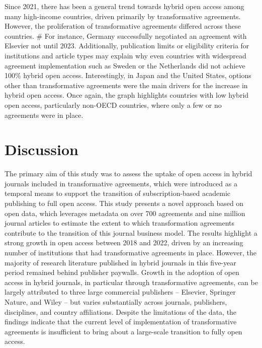 \documentclass[a4paper,man,floatsintext,longtable,noextraspace,12pt]{apa6}
\begin{document}
Since 2021, there has been a general trend towards hybrid open access
among many high-income countries, driven primarily by transformative
agreements. However, the proliferation of transformative agreements
differed across these countries. \# For instance, Germany successfully
negotiated an agreement with Elsevier not until 2023. Additionally,
publication limits or eligibility criteria for institutions and article
types may explain why even countries with widespread agreement
implementation such as Sweden or the Netherlands did not achieve 100\%
hybrid open access. Interestingly, in Japan and the United States,
options other than transformative agreements were the main drivers for
the increase in hybrid open access. Once again, the graph highlights
countries with low hybrid open access, particularly non-OECD countries,
where only a few or no agreements were in place.

\hypertarget{discussion}{%
\section{Discussion}\label{discussion}}

The primary aim of this study was to assess the uptake of open access in
hybrid journals included in transformative agreements, which were
introduced as a temporal means to support the transition of
subscription-based academic publishing to full open access. This study
presents a novel approach based on open data, which leverages metadata
on over 700 agreements and nine million journal articles to estimate the
extent to which transformation agreements contribute to the transition
of this journal business model. The results highlight a strong growth in
open access between 2018 and 2022, driven by an increasing number of
institutions that had transformative agreements in place. However, the
majority of research literature published in hybrid journals in this
five-year period remained behind publisher paywalls. Growth in the
adoption of open access in hybrid journals, in particular through
transformative agreements, can be largely attributed to three large
commercial publishers -- Elsevier, Springer Nature, and Wiley -- but
varies substantially across journals, publishers, disciplines, and
country affiliations. Despite the limitations of the data, the findings
indicate that the current level of implementation of transformative
agreements is insufficient to bring about a large-scale transition to
fully open access.
\end{document}
